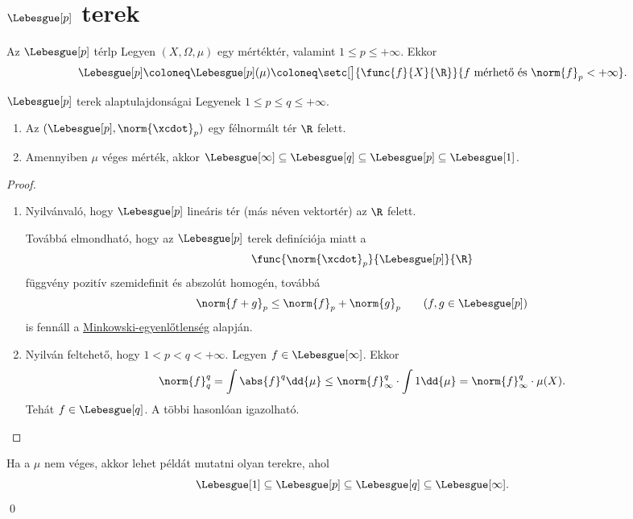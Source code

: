 \documentclass[
]{elteikthesis}[2024/04/26]
\begin{document}
	\newpage
	\section{\( \Lebesgue[p] \) terek}
	
	\begin{definition}{Az \( \Lebesgue[p] \) tér}{lp}
		Legyen \( (X, \Omega, \mu) \) egy mértéktér, valamint \( 1 \leq p \leq +\infty \). Ekkor
		\[
			\Lebesgue[p] \coloneq \Lebesgue[p](\mu) \coloneq
			\setc[\big]{ \func{f}{X}{\R} }{ f \text{ mérhető és } \norm{f}_p < +\infty }.
		\]
	\end{definition}
	
	\begin{theorem}{\( \Lebesgue[p] \) terek alaptulajdonságai}{}
		Legyenek \( 1 \leq p \leq q \leq +\infty \).
		\begin{enumerate}
			\item Az \( (\Lebesgue[p], \norm{\xcdot}_p) \) egy félnormált tér \( \R \) felett.
			\item 
			Amennyiben \( \mu \) véges mérték, akkor 
			\( \Lebesgue[\infty] \subseteq \Lebesgue[q] \subseteq \Lebesgue[p] \subseteq \Lebesgue[1] \).
		\end{enumerate}
	\end{theorem}
	\begin{proof}\,
		\begin{enumerate}
			\item 
			Nyilvánvaló, hogy \( \Lebesgue[p] \) lineáris tér 
			(más néven vektortér) az \( \R \) felett.
			
			Továbbá elmondható, hogy az \( \Lebesgue[p] \) terek definíciója miatt a
			\[
				\func{ \norm{\xcdot}_p }{ \Lebesgue[p] }{ \R }
			\]
			függvény pozitív szemidefinit és abszolút homogén, továbbá
			\[
				\norm{f + g}_p \leq \norm{f}_p + \norm{g}_p \qquad (f, g \in \Lebesgue[p])
			\]
			is fennáll a \hyperref[th:minkowski]{Minkowski-egyenlőtlenség} alapján.
			
			\item
			Nyilván feltehető, hogy \( 1 < p < q < +\infty \).
			Legyen \( f \in \Lebesgue[\infty] \). Ekkor
			\[
				\norm{f}_q^q =
				\int \abs{f}^q \dd{\mu} \leq
				\norm{f}_\infty^q \cdot \int 1 \dd{\mu} =
				\norm{f}_\infty^q \cdot \mu(X).
			\]
			Tehát \( f \in \Lebesgue[q] \). A többi hasonlóan igazolható.
			
			
		\end{enumerate}
	\end{proof}
	\begin{note}
		Ha a \( \mu \) nem véges, akkor lehet példát mutatni olyan terekre, ahol
		\[
			\Lebesgue[1] \subseteq
			\Lebesgue[p] \subseteq
			\Lebesgue[q] \subseteq
			\Lebesgue[\infty].
		\]
		\qed
	\end{note}
	
\end{document}
